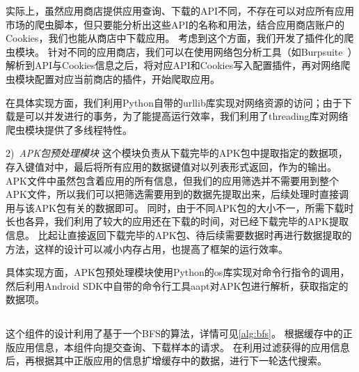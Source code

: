 实际上，虽然应用商店提供应用查询、下载的API不同，不存在可以对应所有应用市场的爬虫脚本，但只要能分析出这些API的名称和用法，结合应用商店账户的Cookies，我们也能从商店中下载应用。
考虑到这个方面，我们开发了插件化的爬虫模块。
针对不同的应用商店，我们可以在使用网络包分析工具（如Burpsuite~\cite{burpsuite}）解析到API与Cookies信息之后，将对应API和Cookies写入配置插件，再对网络爬虫模块配置对应当前商店的插件，开始爬取应用。

在具体实现方面，我们利用Python自带的urllib库实现对网络资源的访问；由于下载是可以并发进行的事务，为了能提高运行效率，我们利用了threading库对网络爬虫模块提供了多线程特性。

2)\ \emph{APK包预处理模块} \quad
这个模块负责从下载完毕的APK包中提取指定的数据项，存入键值对中，最后将所有应用的数据键值对以列表形式返回，作为\componentA 的输出。
APK文件中虽然包含着应用的所有信息，但我们的应用筛选并不需要用到整个APK文件，所以我们可以把筛选需要用到的数据先提取出来，后续处理时直接调用与该APK包有关的数据即可。
同时，由于不同APK包的大小不一，所需下载时长也各异，我们利用了较大的应用还在下载的时间，对已经下载完毕的APK提取信息。
比起让\componentA 直接返回下载完毕的APK包、待后续需要数据时再进行数据提取的方法，这样的设计可以减小内存占用，也提高了框架的运行效率。

具体实现方面，APK包预处理模块使用Python的os库实现对命令行指令的调用，然后利用Android SDK中自带的命令行工具aapt对APK包进行解析，获取指定的数据项。


\subsection{\componentB }
这个组件的设计利用了基于一个BFS的算法，详情可见\autoref{alg:bfs}。
根据缓存中的正版应用信息，本组件向\componentA 提交查询、下载样本的请求。
在利用\componentC 过滤获得的应用信息后，再根据其中正版应用的信息扩增缓存中的数据，进行下一轮迭代搜索。

